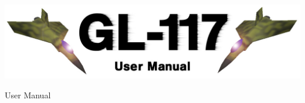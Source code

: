 \thispagestyle{empty}

\begin{center}
\includegraphics[width=16cm]{gl-117.jpg}
\end{center}

\vspace*{5cm}

\begin{center}
\Huge{User Manual}
\end{center}
